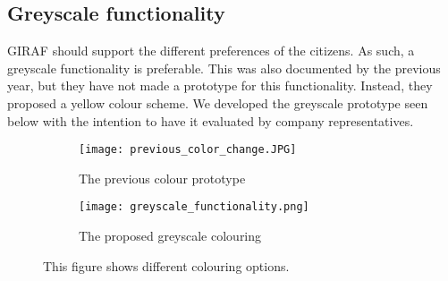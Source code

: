 \subsection{Greyscale functionality}
GIRAF should support the different preferences of the citizens. 
As such, a greyscale functionality is preferable.
This was also documented by the previous year, but they have not made a prototype for this functionality.
Instead, they proposed a yellow colour scheme.
We developed the greyscale prototype seen below with the intention to have it evaluated by company representatives.
\begin{figure}[H]
    \begin{subfigure}{0.5\textwidth}
    \texttt{[image: previous\_color\_change.JPG]} 
    \caption{The previous colour prototype}
    \label{fig:previous_citizen_select}
    \end{subfigure}
    \begin{subfigure}{0.5\textwidth}
        \texttt{[image: greyscale\_functionality.png]}
    \caption{The proposed greyscale colouring}
    \label{fig:new_citizen_select}
    \end{subfigure} 
    \caption{This figure shows different colouring options.}
    \label{fig:citizen_select}
\end{figure}

